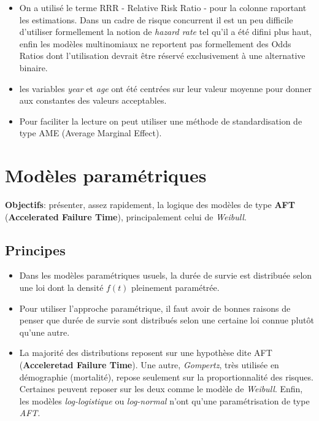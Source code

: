 \documentclass[
  12pt,
  letterpaper,
  DIV=11,
  numbers=noendperiod,
  onepage,
  openany]{scrreprt}
\providecommand{\tightlist}{%
  \setlength{\itemsep}{0pt}\setlength{\parskip}{0pt}}\usepackage{longtable,booktabs,array}
\begin{document}
\begin{itemize}
\tightlist
\item
  On a utilisé le terme RRR - Relative Risk Ratio - pour la colonne
  raportant les estimations. Dans un cadre de risque concurrent il est
  un peu difficile d'utiliser formellement la notion de \emph{hazard
  rate} tel qu'il a été difini plus haut, enfin les modèles multinomiaux
  ne reportent pas formellement des Odds Ratios dont l'utilisation
  devrait être réservé exclusivement à une alternative binaire.
\item
  les variables \emph{year} et \emph{age} ont été centrées sur leur
  valeur moyenne pour donner aux constantes des valeurs acceptables.
\item
  Pour faciliter la lecture on peut utiliser une méthode de
  standardisation de type AME (Average Marginal Effect).
\end{itemize}

\hypertarget{moduxe8les-paramuxe9triques}{%
\chapter{\texorpdfstring{\textbf{Modèles
paramétriques}}{Modèles paramétriques}}\label{moduxe8les-paramuxe9triques}}

\textbf{Objectifs}: présenter, assez rapidement, la logique des modèles
de type \textbf{AFT} (\textbf{Accelerated Failure Time}), principalement
celui de \emph{Weibull}.

\hypertarget{principes}{%
\section{Principes}\label{principes}}

\begin{itemize}
\tightlist
\item
  Dans les modèles paramétriques usuels, la durée de survie est
  distribuée selon une loi dont la densité \(f(t)\) pleinement
  paramétrée.\\
\item
  Pour utiliser l'approche paramétrique, il faut avoir de bonnes raisons
  de penser que durée de survie sont distribués selon une certaine loi
  connue plutôt qu'une autre.
\item
  La majorité des distributions reposent sur une hypothèse dite AFT
  (\textbf{Acceleretad Failure Time}). Une autre, \emph{Gompertz}, très
  utilisée en démographie (mortalité), repose seulement sur la
  proportionnalité des risques. Certaines peuvent reposer sur les deux
  comme le modèle de \emph{Weibull}. Enfin, les modèles
  \emph{log-logistique} ou \emph{log-normal} n'ont qu'une
  paramétrisation de type \emph{AFT}.
\end{itemize}
\end{document}
